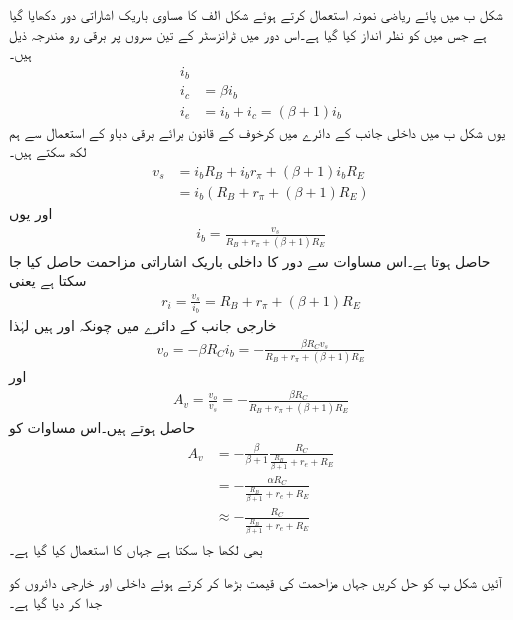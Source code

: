 شکل  ب میں پائے ریاضی نمونہ  استعمال کرتے ہوئے شکل  الف   کا مساوی باریک اشاراتی دور دکھایا گیا ہے جس میں  کو نظر انداز کیا گیا ہے۔اس دور میں ٹرانزسٹر کے تین سروں پر برقی رو مندرجہ ذیل ہیں۔
\begin{align*}
i_b &\\
i_c&=\beta i_b\\
i_e&=i_b+i_c = \left(\beta+1 \right )i_b
\end{align*}
یوں شکل  ب میں داخلی جانب کے دائرے میں کرخوف کے قانون برائے برقی دباو کے استعمال سے ہم لکھ سکتے ہیں۔
\begin{align*}
v_s&=i_b R_B+i_b r_{\pi} + \left(\beta+1 \right ) i_b R_E\\
&=i_b \left(R_B+r_{\pi}+\left(\beta+1 \right )R_E \right )
\end{align*}
اور یوں
\begin{align*}
i_b=\frac{v_s}{R_B+r_{\pi}+\left(\beta+1 \right )R_E}
\end{align*}
حاصل ہوتا ہے۔اس مساوات سے دور کا داخلی باریک اشاراتی مزاحمت حاصل کیا جا سکتا ہے یعنی
\begin{align*}
r_i=\frac{v_s}{i_b}=R_B+r_{\pi}+\left(\beta+1 \right )R_E
\end{align*}
خارجی جانب کے دائرے میں چونکہ  اور   ہیں لہٰذا
\begin{align*}
v_o=-\beta R_C i_b = -\frac{\beta R_C v_s}{R_B+r_{\pi}+\left(\beta+1 \right )R_E}
\end{align*}
اور 
\begin{align}
A_v=\frac{v_o}{v_s}=-\frac{\beta R_C}{R_B +r_{\pi}+\left(\beta+1 \right )R_E}
\end{align}
حاصل ہوتے ہیں۔اس مساوات کو
\begin{gather}
\begin{aligned}\label{مساوات_ٹرانزسٹر_افزائش_کی_عمومی_مساوات}
A_v&=-\frac{\beta}{\beta+1}\frac{R_C}{\frac{R_B}{\beta+1} +r_{e}+R_E}\\
&=-\frac{\alpha R_C}{\frac{R_B}{\beta+1} +r_{e}+R_E}\\
& \approx -\frac{ R_C}{\frac{R_B}{\beta+1} +r_{e}+R_E}
\end{aligned}
\end{gather}
بھی لکھا جا سکتا ہے جہاں  کا استعمال کیا گیا ہے۔

آئیں شکل  پ کو حل کریں جہاں مزاحمت کی قیمت بڑھا کر  کرتے ہوئے داخلی اور خارجی دائروں کو جدا کر دیا گیا ہے۔

